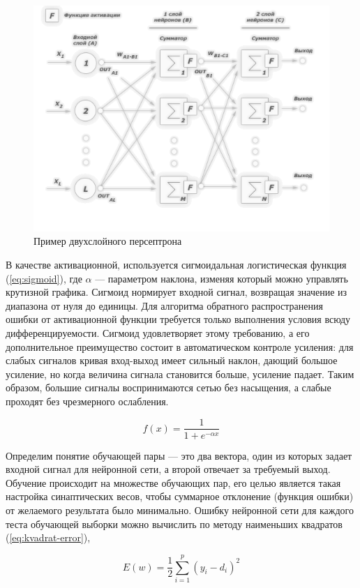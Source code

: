 \documentclass[a4paper,14pt]{extarticle} %
\begin{document}
\begin{figure}[h]
\centering
\includegraphics[width=0.75\linewidth]{NN_multilayer_networks_01}
\caption{Пример двухслойного персептрона}
\label{fig:NN_multilayer_networks_01}
\end{figure}

В качестве активационной, используется сигмоидальная логистическая функция (\ref{eq:sigmoid}), где $\alpha$ --- параметром наклона, изменяя который можно управлять крутизной графика. Сигмоид нормирует входной сигнал, возвращая значение из диапазона от нуля до единицы. Для алгоритма обратного распространения ошибки от активационной функции требуется только выполнения условия всюду дифференцируемости. Сигмоид удовлетворяет этому требованию, а его дополнительное преимущество состоит в автоматическом контроле усиления: для слабых сигналов кривая вход-выход имеет сильный наклон, дающий большое усиление, но когда величина сигнала становится больше, усиление падает. Таким образом, большие сигналы воспринимаются сетью без насыщения, а слабые проходят без чрезмерного ослабления. 

\begin{equation}\label{eq:sigmoid}
f(x)=\frac{1}{1+e^{-\alpha x}}
\end{equation}

Определим понятие обучающей пары --- это два вектора, один из которых задает входной сигнал для нейронной сети, а второй отвечает за требуемый выход. Обучение происходит на множестве обучающих пар, его целью является такая настройка синаптических весов, чтобы суммарное отклонение (функция ошибки) от желаемого результата было минимально. Ошибку нейронной сети для каждого теста обучающей выборки можно вычислить по методу наименьших квадратов (\ref{eq:kvadrat-error}),

\begin{equation}\label{eq:kvadrat-error}
E(w) = \frac{1}{2} \sum\limits_{i=1}^{p} (y_i-d_i)^2
\end{equation}
\end{document}
